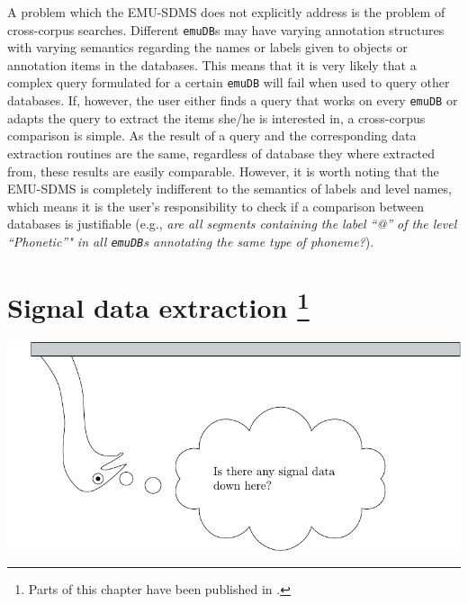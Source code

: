 \documentclass[]{book}
\let\rmarkdownfootnote\footnote%
\def\footnote{\protect\rmarkdownfootnote}
\theoremstyle{definition}
\theoremstyle{definition}
\theoremstyle{definition}
\theoremstyle{remark}
\begin{document}
A problem which the EMU-SDMS does not explicitly address is the problem
of cross-corpus searches. Different \texttt{emuDB}s may have varying
annotation structures with varying semantics regarding the names or
labels given to objects or annotation items in the databases. This means
that it is very likely that a complex query formulated for a certain
\texttt{emuDB} will fail when used to query other databases. If,
however, the user either finds a query that works on every
\texttt{emuDB} or adapts the query to extract the items she/he is
interested in, a cross-corpus comparison is simple. As the result of a
query and the corresponding data extraction routines are the same,
regardless of database they where extracted from, these results are
easily comparable. However, it is worth noting that the EMU-SDMS is
completely indifferent to the semantics of labels and level names, which
means it is the user's responsibility to check if a comparison between
databases is justifiable (e.g., \emph{are all segments containing the
label ``@'' of the level ``Phonetic''" in all \texttt{emuDB}s annotating
the same type of phoneme?}).

\hypertarget{chap:sigDataExtr}{%
\chapter[Signal data extraction ]{\texorpdfstring{Signal data extraction
\footnote{Parts of this chapter have been published in
  \citet{winkelmann:2017aa}.}}{Signal data extraction }}\label{chap:sigDataExtr}}

\begin{center}\includegraphics[width=0.65\linewidth]{pics/EMU-webAppEmu_sigDataExtr} \end{center}
\end{document}
